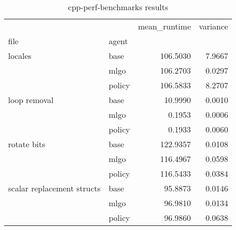 \begin{table}
\begin{center}
    \caption{cpp-perf-benchmarks results}
    \label{table:cpp-perf-benchmarks}
\begin{tabular}{llrr}
\toprule
                           &        &  mean\_runtime &  variance \\
file & agent &               &           \\
\midrule
locales & base &      106.5030 &    7.9667 \\
                           & mlgo &      106.2703 &    0.0297 \\
                           & policy &      106.5833 &    8.2707 \\
loop removal & base &       10.9990 &    0.0010 \\
                           & mlgo &        0.1953 &    0.0006 \\
                           & policy &        0.1933 &    0.0060 \\
rotate bits & base &      122.9357 &    0.0108 \\
                           & mlgo &      116.4967 &    0.0598 \\
                           & policy &      116.5433 &    0.0384 \\
scalar replacement structs & base &       95.8873 &    0.0146 \\
                           & mlgo &       96.9810 &    0.0134 \\
                           & policy &       96.9860 &    0.0638 \\
\bottomrule
\end{tabular}
\end{center}
\end{table}
